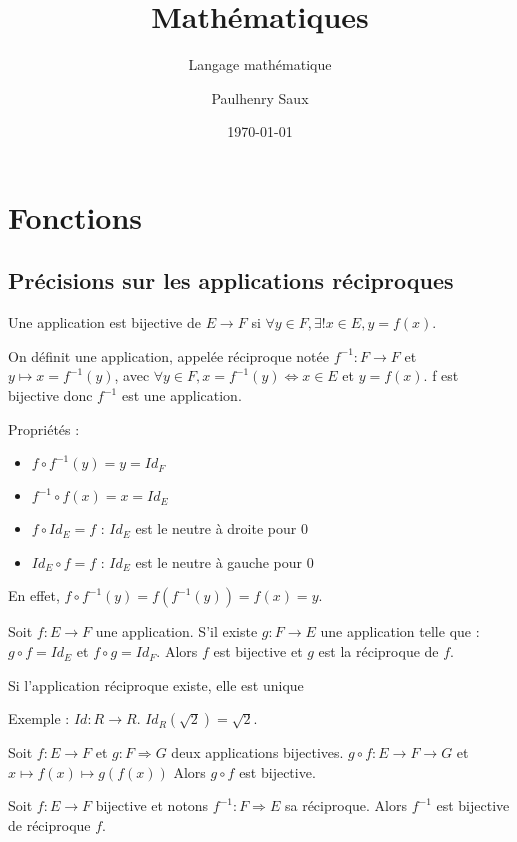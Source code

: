 \documentclass[french]{yLectureNote}
\title{Mathématiques}
\subtitle{Langage mathématique}
\author{Paulhenry Saux}
\date{\today}
\begin{document}
\setcounter{chapter}{2}

	\chapter{Fonctions}
\section{Précisions sur les applications réciproques}
Une application est bijective de $E\rightarrow F$ si $\forall y\in F, \exists!x\in E,y=f(x)$.

On définit une application, appelée réciproque notée $f^{-1} : F\rightarrow F$ et $y\longmapsto x=f^{-1}(y)$, avec $\forall y\in F, x=f^{-1}(y) \iff x\in E$ et $y = f(x)$. f est bijective donc $f^{-1}$ est une application.

Propriétés :
\begin{itemize}
 \item $f\circ f^{-1}(y) = y = Id_F$
  \item $f^{-1}\circ f(x) = x = Id_E$
  \item $f\circ Id_E = f$ : $Id_E$ est le neutre à droite pour 0
  \item $Id_E \circ f = f$ : $Id_E$ est le neutre à gauche pour 0
\end{itemize}
En effet, $f\circ f^{-1}(y) = f(f^{-1}(y)) = f(x) = y$.

\begin{theorem}[Proposition]
Soit $f : E\rightarrow F$ une application. S'il existe $g : F\rightarrow E$ une application telle que : $g\circ f = Id_E$ et $ f\circ g = Id_F$. Alors $f$ est bijective et $g$ est la réciproque de $f$.
\end{theorem}
\begin{theorem}[Corrolaire]
Si l'application réciproque existe, elle est unique
\end{theorem}
Exemple : $Id : R\rightarrow R$. $Id_R (\sqrt{2}) = \sqrt{2}$.


\begin{theorem}[Proposition]
Soit $f : E\rightarrow F$ et $g : F\Rightarrow G$ deux applications bijectives. $g\circ f : E\rightarrow F \rightarrow G$ et $x \longmapsto f(x) \longmapsto g(f(x))$ Alors $g\circ f$ est bijective.
\end{theorem}

\begin{theorem}[Proposition]
Soit $f : E\rightarrow F$ bijective et notons $f^{-1} : F\Rightarrow E$ sa réciproque. Alors $f^{-1}$ est bijective de réciproque $f$.
\end{theorem}
\end{document}

